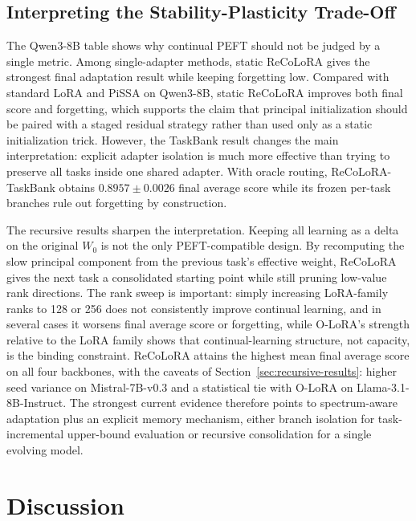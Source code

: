 \documentclass[11pt]{article}
\begin{document}
\subsection{Interpreting the Stability-Plasticity Trade-Off}
The Qwen3-8B table shows why continual PEFT should not be judged by a single metric. Among single-adapter methods, static ReCoLoRA gives the strongest final adaptation result while keeping forgetting low. Compared with standard LoRA and PiSSA on Qwen3-8B, static ReCoLoRA improves both final score and forgetting, which supports the claim that principal initialization should be paired with a staged residual strategy rather than used only as a static initialization trick. However, the TaskBank result changes the main interpretation: explicit adapter isolation is much more effective than trying to preserve all tasks inside one shared adapter. With oracle routing, ReCoLoRA-TaskBank obtains $0.8957\pm0.0026$ final average score while its frozen per-task branches rule out forgetting by construction.

The recursive results sharpen the interpretation. Keeping all learning as a delta on the original $W_0$ is not the only PEFT-compatible design. By recomputing the slow principal component from the previous task's effective weight, ReCoLoRA gives the next task a consolidated starting point while still pruning low-value rank directions. The rank sweep is important: simply increasing LoRA-family ranks to 128 or 256 does not consistently improve continual learning, and in several cases it worsens final average score or forgetting, while O-LoRA's strength relative to the LoRA family shows that continual-learning structure, not capacity, is the binding constraint. ReCoLoRA attains the highest mean final average score on all four backbones, with the caveats of Section~\ref{sec:recursive-results}: higher seed variance on Mistral-7B-v0.3 and a statistical tie with O-LoRA on Llama-3.1-8B-Instruct. The strongest current evidence therefore points to spectrum-aware adaptation plus an explicit memory mechanism, either branch isolation for task-incremental upper-bound evaluation or recursive consolidation for a single evolving model.

\section{Discussion}
\end{document}
